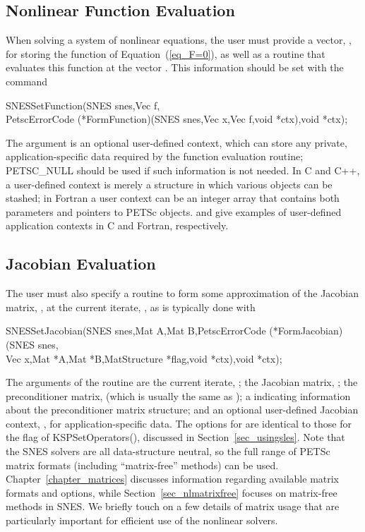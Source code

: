 \subsection{Nonlinear Function Evaluation}
\label{sec_snesfunction}

When solving a system of nonlinear equations, the user must provide
a vector, , for storing the function of
Equation~(\ref{eq_F=0}), as well as a routine that evaluates this
function at the vector .  This information should be set with
the command
\begin{tabbing}
  SNESSetFunction(SNES snes,Vec f,\\
          PetscErrorCode (*FormFunction)(SNES snes,Vec x,Vec f,void *ctx),void *ctx);
\end{tabbing}
The argument  is an optional user-defined context, which can
store any private, application-specific data required by the
function evaluation routine; PETSC_NULL should be used if such information
is not needed.  In C and C++, a user-defined context is merely a
structure in which various objects can be stashed; in Fortran a user
context can be an integer array that contains both parameters and
pointers to PETSc objects.  and
 give examples of user-defined
application contexts in C and Fortran, respectively.

\subsection{Jacobian Evaluation}
\label{sec_snesjacobian}

The user must also specify a routine to form some approximation of the
Jacobian matrix, , at the current iterate, ,
as is typically done with
\begin{tabbing}
  SNESSetJacobian(SNES snes,Mat A,Mat B,PetscErrorCode (*FormJacobian)(SNES snes,\\
          Vec x,Mat *A,Mat *B,MatStructure *flag,void *ctx),void *ctx);
\end{tabbing}
The arguments of the routine  are the current iterate, ; the Jacobian matrix,
; the preconditioner matrix,  (which is usually the same
as ); a  indicating information about the
preconditioner matrix structure; and an optional user-defined Jacobian
context, , for application-specific data.  The options for
 are identical to those for the flag of KSPSetOperators(), discussed in Section~\ref{sec_usingsles}.  
Note that the SNES solvers are all data-structure neutral, so the full
range of PETSc matrix formats (including ``matrix-free''
methods) can be used.  Chapter~\ref{chapter_matrices} discusses
information regarding available matrix formats and options, while
Section~\ref{sec_nlmatrixfree} focuses on matrix-free
methods in SNES. We briefly touch on a few details of matrix usage that are
particularly important for efficient use of the nonlinear solvers.

